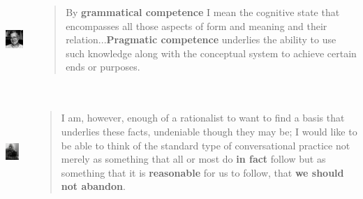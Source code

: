 \documentclass[compress]{beamer}
\begin{document}
\begin{frame}
\frametitle{\cite{chomsky1980rules}}
\begin{columns}[T]  
   \begin{column}{.25\textwidth}
	  \vspace{15pt}
	  \includegraphics[height=1in]{chomsky.jpg}   
   \end{column}
   \begin{column}{.7\textwidth}
      \begin{block}{}
      \begin{quote}
	   By \textbf{grammatical competence} I  mean the cognitive state that encompasses all those aspects of form and meaning and their relation...\textbf{Pragmatic competence} underlies the ability to use such knowledge along with the conceptual system to achieve certain ends or purposes. 
      \end{quote}           
      \end{block}
    \end{column}
  \end{columns}
\end{frame}

\begin{frame}
\frametitle{\cite{grice:1975}}
\begin{columns}[T]  
   \begin{column}{.25\textwidth}
	  \vspace{20pt}
	  \includegraphics[height=1.2in]{grice.jpg}   
   \end{column}
   \begin{column}{.7\textwidth}
      \begin{block}{}
      \begin{quote}
	   I am, however, enough of a rationalist to want to find a basis that underlies these facts, undeniable though they may be; I would like to be able to think of the standard type of conversational practice not merely as something that all or most do \textbf{in fact} follow but as something that it is \textbf{reasonable} for us to follow, that \textbf{we should not abandon}. 
      \end{quote}           
      \end{block}
    \end{column}
  \end{columns}
\end{frame}
\end{document}
